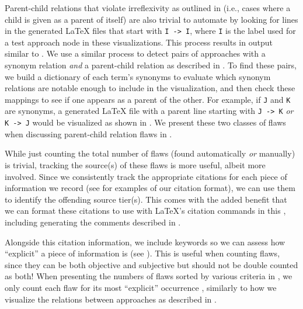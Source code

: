 \ExampleFlawGraphs{}

\label{autoSelfPar}
Parent-child relations that violate irreflexivity as outlined in
 (i.e., cases where a child is given as a parent of itself)
are also trivial to automate by looking for lines in the generated \LaTeX{}
files that start with \texttt{I~->~I}, where \texttt{I} is the label used for a
test approach node in these visualizations. This process results in output
similar to .%
\label{autoParSyn} We use a similar process to detect pairs of
approaches with a synonym relation \emph{and} a parent-child relation as
described in . To find these pairs, we build a dictionary of
each term's synonyms to evaluate which synonym relations are notable enough
to include in the visualization, and then check these mappings to see if one
appears as a parent of the other. For example, if \texttt{J} and \texttt{K} are
synonyms, a generated \LaTeX{} file with a parent line starting with
\texttt{J~->~K} \emph{or} \texttt{K~->~J} would be visualized as shown in
. We present these two
classes of flaws when discussing parent-child relation flaws in .

While just counting the total number of flaws (found automatically \emph{or}
manually) is trivial, tracking
the source(s) of these flaws is more useful, albeit more involved. Since
we consistently track the appropriate citations for each piece of information
we record (see  for examples
of our citation format), we can use them to
identify the offending source tier(s). This comes with the added benefit that
we can format these citations to use with \LaTeX{}'s citation commands in this
\docType{}, including generating the comments described in
.

\label{auto-flaw-detect-explicitness}
Alongside this citation information, we include keywords so we can assess how
``explicit'' a piece of information is (see ). This is
useful when counting flaws, since they can be both objective and subjective but
should not be double counted as both! When presenting
the numbers of flaws sorted by various criteria in ,
we only count each flaw for its most ``explicit'' occurrence%
, similarly to how we visualize the relations
between approaches as described in .

